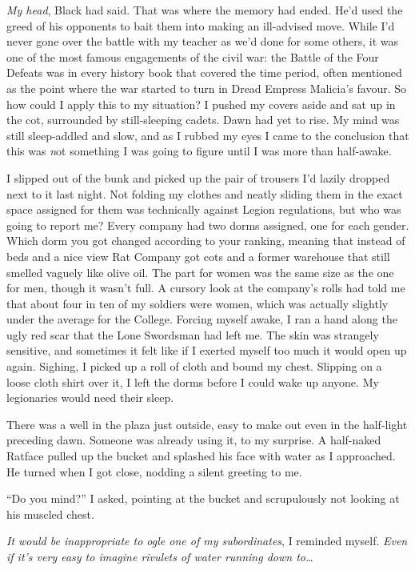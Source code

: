 \documentclass[12pt, openany]{book}
\begin{document}
\textit{My head}, Black had said. That was where the memory had ended. He’d used the greed of his opponents to bait them into making an ill-advised move. While I’d never gone over the battle with my teacher as we’d done for some others, it was one of the most famous engagements of the civil war: the Battle of the Four Defeats was in every history book that covered the time period, often mentioned as the point where the war started to turn in Dread Empress Malicia’s favour. So how could I apply this to my situation?\textit{ }I pushed my covers aside and sat up in the cot, surrounded by still-sleeping cadets. Dawn had yet to rise. My mind was still sleep-addled and slow, and as I rubbed my eyes I came to the conclusion that this was\textit{ n}ot something I was going to figure until I was more than half-awake.

I slipped out of the bunk and picked up the pair of trousers I’d lazily dropped next to it last night. Not folding my clothes and neatly sliding them in the exact space assigned for them was technically against Legion regulations, but who was going to report me? Every company had two dorms assigned, one for each gender. Which dorm you got changed according to your ranking, meaning that instead of beds and a nice view Rat Company got cots and a former warehouse that still smelled vaguely like olive oil. The part for women was the same size as the one for men, though it wasn’t full. A cursory look at the company’s rolls had told me that about four in ten of my soldiers were women, which was actually slightly under the average for the College. Forcing myself awake, I ran a hand along the ugly red scar that the Lone Swordsman had left me. The skin was strangely sensitive, and sometimes it felt like if I exerted myself too much it would open up again. Sighing, I picked up a roll of cloth and bound my chest. Slipping on a loose cloth shirt over it, I left the dorms before I could wake up anyone. My legionaries would need their sleep.

There was a well in the plaza just outside, easy to make out even in the half-light preceding dawn. Someone was already using it, to my surprise. A half-naked Ratface pulled up the bucket and splashed his face with water as I approached. He turned when I got close, nodding a silent greeting to me.

“Do you mind?” I asked, pointing at the bucket and scrupulously not looking at his muscled chest.

\textit{It would be inappropriate to ogle one of my subordinates}, I reminded myself. \textit{Even if it’s very easy to imagine rivulets of water running down to…} 
\end{document}

